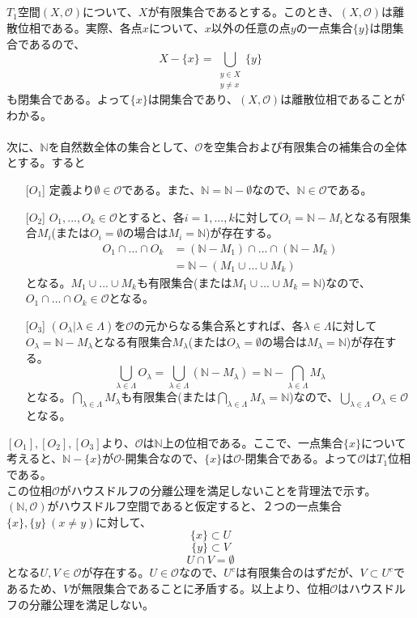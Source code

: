 \documentclass{jsarticle}
\begin{document}
\subsection{}
$T_1$空間$(X,\mathcal{O})$について、$X$が有限集合であるとする。このとき、$(X,\mathcal{O})$は離散位相である。実際、各点$x$について、$x$以外の任意の点$y$の一点集合$\{y\}$は閉集合であるので、
\[X-\{x\}=\bigcup_{\substack{y\in X\\y\neq x}}\{y\}\]
も閉集合である。よって$\{x\}$は開集合であり、$(X,\mathcal{O})$は離散位相であることがわかる。\\
\\
次に、$\mathbb{N}$を自然数全体の集合として、$\mathcal{O}$を空集合および有限集合の補集合の全体とする。すると
\begin{enumerate}
\item[{[$O_1$]}] 定義より$\emptyset\in\mathcal{O}$である。また、$\mathbb{N}=\mathbb{N}-\emptyset$なので、$\mathbb{N}\in\mathcal{O}$である。

\item[{[$O_2$]}] $O_1,...,O_k\in\mathcal{O}$とすると、各$i=1,...,k$に対して$O_i=\mathbb{N}-M_i$となる有限集合$M_i$(または$O_i=\emptyset$の場合は$M_i=\mathbb{N}$)が存在する。
\begin{align*}
O_1\cap...\cap O_k&=(\mathbb{N}-M_1)\cap...\cap(\mathbb{N}-M_k)\\
&=\mathbb{N}-(M_1\cup...\cup M_k)
\end{align*}
となる。$M_1\cup...\cup M_k$も有限集合(または$M_1\cup...\cup M_k=\mathbb{N}$)なので、$O_1\cap...\cap O_k\in\mathcal{O}$となる。

\item[{[$O_3$]}] $(O_\lambda|\lambda\in\Lambda)$を$\mathcal{O}$の元からなる集合系とすれば、各$\lambda\in\Lambda$に対して$O_\lambda=\mathbb{N}-M_\lambda$となる有限集合$M_\lambda$(または$O_\lambda=\emptyset$の場合は$M_\lambda=\mathbb{N}$)が存在する。
\[\bigcup_{\lambda\in\Lambda}O_\lambda=\bigcup_{\lambda\in\Lambda}(\mathbb{N}-M_\lambda)=\mathbb{N}-\bigcap_{\lambda\in\Lambda}M_\lambda\]
となる。$\bigcap_{\lambda\in\Lambda}M_\lambda$も有限集合(または$\bigcap_{\lambda\in\Lambda}M_\lambda=\mathbb{N}$)なので、$\bigcup_{\lambda\in\Lambda}O_\lambda\in\mathcal{O}$となる。
\end{enumerate}
$[O_1],[O_2],[O_3]$より、$\mathcal{O}$は$\mathbb{N}$上の位相である。ここで、一点集合$\{x\}$について考えると、$\mathbb{N}-\{x\}$が$\mathcal{O}$-開集合なので、$\{x\}$は$\mathcal{O}$-閉集合である。よって$\mathcal{O}$は$T_1$位相である。\\
この位相$\mathcal{O}$がハウスドルフの分離公理を満足しないことを背理法で示す。$(\mathbb{N},\mathcal{O})$がハウスドルフ空間であると仮定すると、２つの一点集合$\{x\},\{y\}\ (x\neq y)$に対して、
\[\{x\}\subset U\]
\[\{y\}\subset V\]
\[U\cap V=\emptyset\]
となる$U,V\in\mathcal{O}$が存在する。$U\in\mathcal{O}$なので、$U^c$は有限集合のはずだが、$V\subset U^c$であるため、$V$が無限集合であることに矛盾する。以上より、位相$\mathcal{O}$はハウスドルフの分離公理を満足しない。
\end{document}
